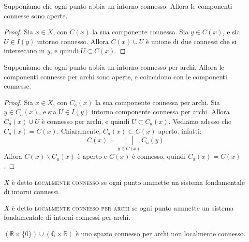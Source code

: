 \begin{prop}
Supponiamo che ogni punto abbia un intorno connesso. Allora le componenti connesse sono aperte.
\end{prop}
\begin{proof}
Sia $x \in X$, con $C(x)$ la sua componente connessa. Sia $y \in C(x)$, e sia $U \in I(y)$ intorno connesso. Allora $C(x) \cup U$ è unione di due connessi che si intersecano in $y$, e quindi $U \subset C(x)$.
\end{proof}

\begin{prop}
Supponiamo che ogni punto abbia un intorno connesso per archi. Allora le componenti connesse per archi sono aperte, e coincidono con le componenti connesse.
\end{prop}
\begin{proof}
Sia $x \in X$, con $C_a(x)$ la sua componente connessa per archi. Sia $y \in C_a(x)$, e sia $U \in I(y)$ intorno componente connessa per archi. Allora $C_a(x) \cup U$ è connesso per archi, e quindi $U \subset C_a(x)$. Vediamo adesso che $C_a(x)=C(x)$. Chiaramente, $C_a(x) \subset C(x)$ aperto, infatti:
$$C(x)=\bigsqcup _{y \in C(x)} C_a(y)$$
Allora $C(x) \smallsetminus C_a(x)$ è aperto e $C(x)$ è connesso, quindi $C_a(x)=C(x)$.
\end{proof}

\begin{defn}
$X$ è detto \textsc{localmente connesso} se ogni punto ammette un sistema fondamentale di intorni connessi.
\end{defn}

\begin{defn}
$X$ è detto \textsc{localmente connesso per archi} se ogni punto ammette un sistema fondamentale di intorni connessi per archi.
\end{defn}

\begin{ex}
$(\mathbb{R}\times \{0\}) \cup (\mathbb{Q}\times \mathbb{R})$ è uno spazio connesso per archi non localmente connesso.
\end{ex}
